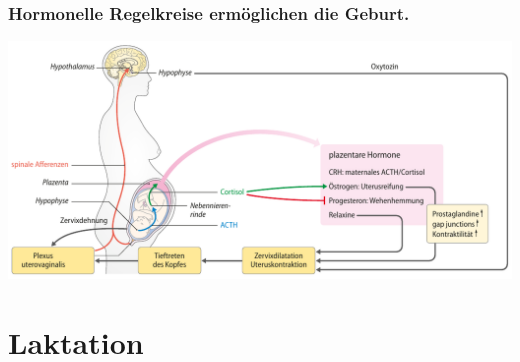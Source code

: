 \documentclass{beamer}
\begin{document}
\begin{frame}
\frametitle{Hormonelle Regelkreise ermöglichen die Geburt. }

\begin{center}
\includegraphics[width=\textwidth]{geburt_hormone}
\end{center}


\end{frame}






\section{Laktation}








\end{document}
